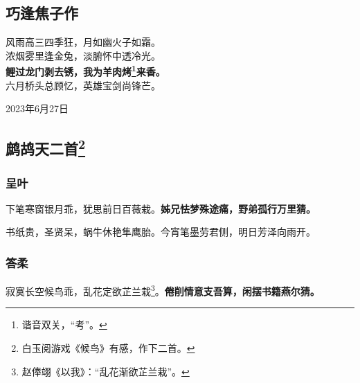 \documentclass[a5paper]{ctexart}
\begin{document}
	\subsection{巧逢焦子作}
	\begin{center}
		风雨高三四季狂，月如幽火子如霜。\\
		浓烟雾里逢金兔，淡腑怀中透冷光。\\
		\textbf{鲤过龙门剥去锈，我为羊肉烤\footnote{谐音双关，“考”。}来香。}\\
		六月桥头总顾忆，英雄宝剑尚锋芒。
		
	\end{center}
	\begin{flushright}
		2023年6月27日
	\end{flushright}
	
	\subsection[鹧鸪天二首]{鹧鸪天二首\footnote{白玉阅游戏《候鸟》有感，作下二首。}}
	\subsubsection{呈叶}
	下笔寒窗银月乖，犹思前日百薇栽。\textbf{姊兄怯梦殊途痛，野弟孤行万里猜。}
	
	书纸贵，圣贤呆，蜗牛休艳隼鹰胎。今宵笔墨劳君侧，明日芳泽向雨开。
	
	\subsubsection{答柔}
	寂寞长空候鸟乖，乱花定欲芷兰栽\footnote{赵俸翊《以我》：“乱花渐欲芷兰栽”。}。\textbf{倦削情意支吾算，闲摆书籍燕尔猜。}
	
\end{document}
